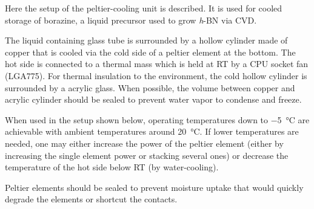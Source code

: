 Here the setup of the peltier-cooling unit is described. It is used for cooled  storage of borazine, a liquid precursor used to grow \textit{h}-BN via CVD.

The liquid containing glass tube is surrounded by a hollow cylinder made of copper that is cooled via the cold side of a peltier element at the bottom. The hot side is connected to a thermal mass which is held at RT by a CPU socket fan (LGA775). For thermal insulation to the environment, the cold hollow cylinder is surrounded by a acrylic glass. When possible, the volume between copper and acrylic cylinder should be sealed to prevent water vapor to condense and freeze. 

When used in the setup shown below, operating temperatures down to \SI{-5}{\celsius} are achievable with ambient temperatures around \SI{20}{\celsius}. If lower temperatures are needed, one may either increase the power of the peltier element (either by increasing the single element power or stacking several ones) or decrease the temperature of the hot side below RT (by water-cooling).

Peltier elements should be sealed to prevent moisture uptake that would quickly degrade the elements or shortcut the contacts.